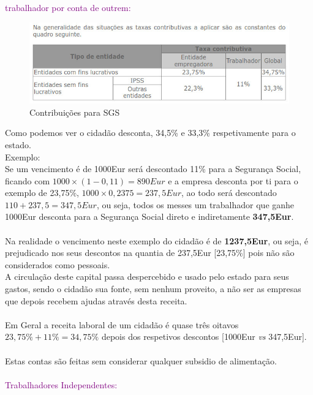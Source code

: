 \textup{\large \textcolor{purple}{trabalhador por conta de outrem:}}\\
\begin{figure}[H]
\flushleft
\includegraphics[scale=.5]{./image/SGS/Contribuicoes_1.jpg}
\caption{Contribuições para SGS}
\end{figure}\par
Como podemos ver o cidadão desconta, 34,5\% e 33,3\% respetivamente para o estado.\\
Exemplo:\\ 
Se um vencimento é de 1000Eur será descontado 11\% para a Segurança Social, ficando com $1000\times (1-0,11)=890Eur$ e a empresa desconta por ti para o exemplo de 23,75\%, $1000\times 0,2375=237,5Eur$, ao todo será descontado $110+237,5=347,5Eur$, ou seja, todos os messes um trabalhador que ganhe 1000Eur desconta para a Segurança Social direto e indiretamente \textbf{347,5Eur}.\\ \\
Na realidade o vencimento neste exemplo do cidadão é de \textbf{1237,5Eur}, ou seja, é prejudicado nos seus descontos na quantia de 237,5Eur [23,75\%] pois não são considerados como pessoais.\\
A circulação deste capital passa despercebido e usado pelo estado para seus gastos, sendo o cidadão sua fonte, sem nenhum proveito, a não ser as empresas que depois recebem ajudas através desta receita.\\ \\
Em Geral a receita laboral de um cidadão é quase três oitavos $23,75\%+11\%=34,75\%$ depois dos respetivos descontos [1000Eur \textit{vs} 347,5Eur].\\ \\
Estas contas são feitas sem considerar qualquer subsidio de alimentação.\\ \\

\textup{\large \textcolor{purple}{Trabalhadores Independentes:}}\\

